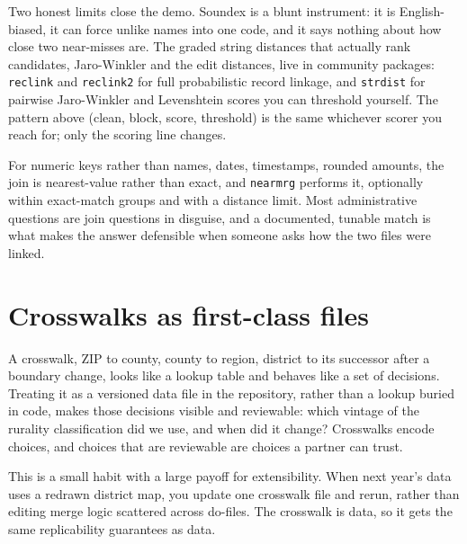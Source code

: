 \documentclass[
    a4paper,
    fontsize=10pt,
    twoside=true,
    numbers=noenddot,
]{kaobook}
\begin{document}
Two honest limits close the demo. Soundex is a blunt instrument: it is English-biased, it can force unlike names into one code, and it says nothing about how close two near-misses are. The graded string distances that actually rank candidates, Jaro-Winkler and the edit distances, live in community packages: \texttt{reclink} and \texttt{reclink2} for full probabilistic record linkage, and \texttt{strdist} for pairwise Jaro-Winkler and Levenshtein scores you can threshold yourself. The pattern above (clean, block, score, threshold) is the same whichever scorer you reach for; only the scoring line changes.

For numeric keys rather than names, dates, timestamps, rounded amounts, the join is nearest-value rather than exact, and \texttt{nearmrg} performs it, optionally within exact-match groups and with a distance limit. Most administrative questions are join questions in disguise, and a documented, tunable match is what makes the answer defensible when someone asks how the two files were linked.

\section{Crosswalks as first-class files}
A crosswalk, ZIP to county, county to region, district to its successor after a boundary change, looks like a lookup table and behaves like a set of decisions. Treating it as a versioned data file in the repository, rather than a lookup buried in code, makes those decisions visible and reviewable: which vintage of the rurality classification did we use, and when did it change? Crosswalks encode choices, and choices that are reviewable are choices a partner can trust.

This is a small habit with a large payoff for extensibility. When next year's data uses a redrawn district map, you update one crosswalk file and rerun, rather than editing merge logic scattered across do-files. The crosswalk is data, so it gets the same replicability guarantees as data.
\end{document}
